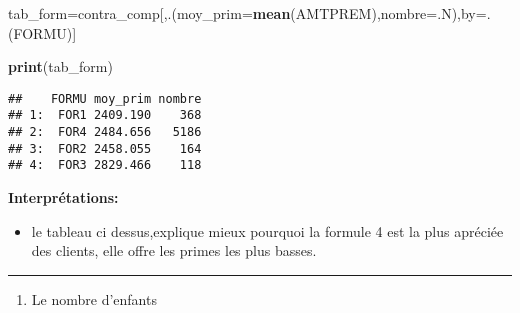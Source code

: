 \documentclass[
]{article}
\newenvironment{Shaded}{\begin{snugshade}}{\end{snugshade}}
\newcommand{\DataTypeTok}[1]{\textcolor[rgb]{0.13,0.29,0.53}{#1}}
\newcommand{\KeywordTok}[1]{\textcolor[rgb]{0.13,0.29,0.53}{\textbf{#1}}}
\newcommand{\NormalTok}[1]{#1}
\newcommand{\OperatorTok}[1]{\textcolor[rgb]{0.81,0.36,0.00}{\textbf{#1}}}
\providecommand{\tightlist}{%
  \setlength{\itemsep}{0pt}\setlength{\parskip}{0pt}}
\begin{document}
\begin{Shaded}
\begin{Highlighting}[]
\NormalTok{tab_form=contra_comp[,.(}\DataTypeTok{moy_prim=}\KeywordTok{mean}\NormalTok{(AMTPREM),}\DataTypeTok{nombre=}\NormalTok{.N),by=.(FORMU)]}

\KeywordTok{print}\NormalTok{(tab_form)}
\end{Highlighting}
\end{Shaded}

\begin{verbatim}
##    FORMU moy_prim nombre
## 1:  FOR1 2409.190    368
## 2:  FOR4 2484.656   5186
## 3:  FOR2 2458.055    164
## 4:  FOR3 2829.466    118
\end{verbatim}

\textbf{Interprétations:}

\begin{itemize}
\tightlist
\item
  le tableau ci dessus,explique mieux pourquoi la formule 4 est la plus
  apréciée des clients, elle offre les primes les plus basses.
\end{itemize}

\begin{center}\rule{0.5\linewidth}{0.5pt}\end{center}

\begin{enumerate}
\def\labelenumi{\arabic{enumi}.}
\setcounter{enumi}{3}
\tightlist
\item
  Le nombre d'enfants
\end{enumerate}

\begin{Shaded}
\end{Shaded}
\end{document}
